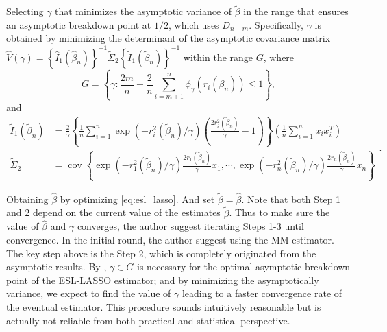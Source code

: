 \item[Step 2:] Selecting $\gamma$ that minimizes the asymptotic variance of $\tilde \beta$ in the range that ensures an asymptotic breakdown point at $1/2$, which uses $D_{n-m}$. Specifically, $\gamma$ is obtained by minimizing the determinant of the asymptotic covariance matrix $\hat{V}(\gamma)=\left\{\hat{I}_{1}\left(\hat{\beta}_{n}\right)\right\}^{-1}
\tilde{\Sigma}_{2}\left\{\tilde{I}_{1}\left(\tilde{\beta}_{n}\right)\right\}^{-1}$ within the range $G$, where 
\[ \label{eq:G}
    G =
\left\{\gamma: \frac{2m}{n} + \frac{2}{n}\sum_{ i =m+ 1}^n \phi_\gamma(r_i(\tilde \beta_n))\leq 1\right\}, \] 
and 
 \[
\begin{aligned} 
    \tilde{I}_{1}\left(\tilde{\beta}_{n}\right) 
    &=\frac{2}{\gamma}\left\{\frac{1}{n} \sum_{i=1}^{n} \exp \left(-r_{i}^{2}\left(\tilde{\beta}_{n}\right) / \gamma\right)\left(\frac{2r_{i}^{2}\left(\tilde{\beta}_{n}\right)}{\gamma}-1\right)\right\}\left(\frac{1}{n} \sum_{i=1}^{n} {x}_{i} {x}_{i}^{T}\right) \\ \tilde{\Sigma}_{2} 
    &=\operatorname{cov}\left\{\exp
\left(-r_{1}^{2}\left(\tilde{\beta}_{n}\right) / \gamma\right) \frac{2
r_{1}\left(\tilde{\beta}_{n}\right)}{\gamma} {x}_{1}, \cdots, \exp
\left(-r_{n}^{2}\left(\tilde{\beta}_{n}\right) / \gamma\right) \frac{2
r_{n}\left(\tilde{\beta}_{n}\right)}{\gamma} {x}_{n}\right\} 
\end{aligned}.
\]

\item[Step 3:] Obtaining  $\hat \beta$ by optimizing \cref{eq:esl_lasso}. And set $\tilde \beta = \hat \beta$.
\eenum
Note that both Step 1 and 2 depend on the current value of the estimates $\tilde \beta$. Thus to make sure the value of $\hat \beta$ and $\gamma$ converges, the author suggest iterating Steps 1-3 until convergence. In the initial round, the author suggest using the MM-estimator.
The key step above is the Step 2, which is completely originated from the asymptotic results. By \citet[Theorem 2.]{wang2013robust}, $\gamma \in G$ is necessary for the optimal asymptotic breakdown point of the ESL-LASSO estimator; and by minimizing the asymptotically variance, we expect to find the value of $\gamma$ leading to a faster convergence rate of the eventual estimator. This procedure sounds intuitively reasonable but is actually not reliable from both practical and statistical perspective.


